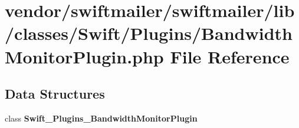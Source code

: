 \section{vendor/swiftmailer/swiftmailer/lib/classes/\+Swift/\+Plugins/\+Bandwidth\+Monitor\+Plugin.php File Reference}
\label{_bandwidth_monitor_plugin_8php}
\subsection*{Data Structures}
\begin{DoxyCompactItemize}
\item 
class {\bf Swift\+\_\+\+Plugins\+\_\+\+Bandwidth\+Monitor\+Plugin}
\end{DoxyCompactItemize}
